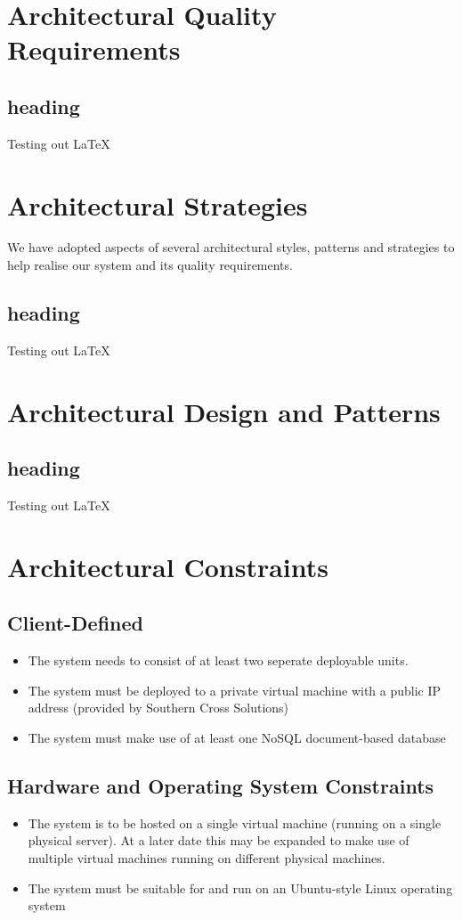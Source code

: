 \documentclass[12pt]{article}
\begin{document}
\section{Architectural Quality Requirements}
\subsection{heading}
Testing out LaTeX


\section{Architectural Strategies}
We have adopted aspects of several architectural styles, patterns and strategies to help realise our system and its quality requirements.
\subsection{heading}
Testing out LaTeX


\section{Architectural Design and Patterns}
\subsection{heading}
Testing out LaTeX

\section{Architectural Constraints}
\subsection{Client-Defined}
\begin{itemize}
    \item The system needs to consist of at least two seperate deployable units.
    \item The system must be deployed to a private virtual machine with a public IP address (provided by Southern Cross Solutions)
    \item The system must make use of at least one NoSQL document-based database
\end{itemize}
\subsection{Hardware and Operating System Constraints}
\begin{itemize}
    \item The system is to be hosted on a single virtual machine (running on a single physical server). At a later date this may be expanded to make use of multiple virtual machines running on different physical machines.
    \item The system must be suitable for and run on an Ubuntu-style Linux operating system
\end{itemize}
\end{document}

